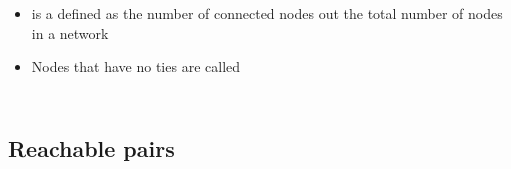 \documentclass[8pt]{beamer}
\begin{document}
\begin{frame}
\frametitle{\insertsection}
\framesubtitle{\insertsubsection}

\begin{columns}
\begin{itemize}[<+->]
	\item {\color{blue}{Inclusiveness}} is a defined as the number of connected nodes out the total number of nodes in a  network
	\item Nodes that have no ties are called {\color{blue}{isolates}}
\end{itemize}

\centering
{}

\end{columns}

\end{frame}

\subsection{Reachable pairs}
\end{document}
